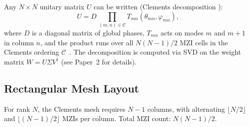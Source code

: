 \documentclass[12pt, a4paper]{article}
\begin{document}
Any $N\times N$ unitary matrix $U$ can be written (Clements decomposition
\cite{clements2016}):
\begin{equation}
  U = D\, \prod_{(m,n)\in \mathcal{C}} T_{mn}(\theta_{mn}, \varphi_{mn}),
  \label{eq:clements}
\end{equation}
where $D$ is a diagonal matrix of global phases,
$T_{mn}$ acts on modes $m$ and $m+1$ in column $n$,
and the product runs over all
$N(N-1)/2$ MZI cells in the Clements ordering
$\mathcal{C}$~\cite{clements2016}.
The decomposition is computed via SVD on the weight matrix $W = U\Sigma V^\dagger$
(see Paper~2 for details).

\subsection{Rectangular Mesh Layout}

For rank $N$, the Clements mesh requires $N-1$ columns, with alternating
$\lfloor N/2\rfloor$ and $\lfloor (N-1)/2\rfloor$ MZIs per column.
Total MZI count: $N(N-1)/2$.
\end{document}
